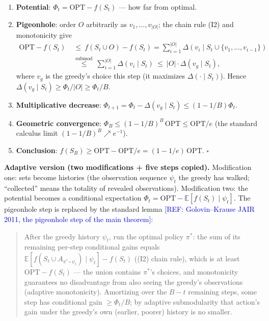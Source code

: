 \documentclass{article}
\newcommand{\refadd}[1]{\textcolor{blue}{[REF: #1]}}
\providecommand{\qed}{\hfill$\square$}
\begin{document}
\begin{enumerate}
\item \textbf{Potential}: $\Phi_t=\mathrm{OPT}-f(S_t)$ --- how far from optimal.
\item \textbf{Pigeonhole}: order $O$ arbitrarily as $v_1,\dots,v_{|O|}$; the chain rule (I2) and monotonicity give
\[
\begin{aligned}
\mathrm{OPT}-f(S_t)\;&\le\ f(S_t\cup O)-f(S_t)=\sum_{i=1}^{|O|}\Delta(v_i\mid S_t\cup\{v_1,\dots,v_{i-1}\})\\
&\overset{\text{submod}}{\le}\ \sum_{i=1}^{|O|}\Delta(v_i\mid S_t)\ \le\ |O|\cdot\Delta(v_g\mid S_t),
\end{aligned}
\]
where $v_g$ is the greedy's choice this step (it maximizes $\Delta(\cdot\mid S_t)$). Hence $\Delta(v_g\mid S_t)\ge\Phi_t/|O|\ge\Phi_t/B$.
\item \textbf{Multiplicative decrease}: $\Phi_{t+1}=\Phi_t-\Delta(v_g\mid S_t)\le(1-1/B)\Phi_t$.
\item \textbf{Geometric convergence}: $\Phi_B\le(1-1/B)^B\,\mathrm{OPT}\le\mathrm{OPT}/e$ (the standard calculus limit $(1-1/B)^B\nearrow e^{-1}$).
\item \textbf{Conclusion}: $f(S_B)\ge\mathrm{OPT}-\mathrm{OPT}/e=(1-1/e)\,\mathrm{OPT}$. \qed{}
\end{enumerate}

\textbf{Adaptive version (two modifications + five steps copied).} Modification one: sets become histories (the observation sequence $\psi_t$ the greedy has walked; ``collected'' means the totality of revealed observations). Modification two: the potential becomes a conditional expectation $\Phi_t=\mathrm{OPT}-\mathbb E[f(S_t)\mid\psi_t]$. The pigeonhole step is replaced by the standard lemma \refadd{Golovin--Krause JAIR 2011, the pigeonhole step of the main theorem}:

\begin{quote}
After the greedy history $\psi_t$, run the optimal policy $\pi^*$: the sum of its remaining per-step conditional gains equals $\mathbb E[f(S_t\cup A_{\pi^*\circ\psi_t})\mid\psi_t]-f(S_t)$ ((I2) chain rule), which is at least $\mathrm{OPT}-f(S_t)$ --- the union contains $\pi^*$'s choices, and monotonicity guarantees no disadvantage from also seeing the greedy's observations (adaptive monotonicity). Amortizing over the $B-t$ remaining steps, some step has conditional gain $\ge\Phi_t/B$; by adaptive submodularity that action's gain under the greedy's own (earlier, poorer) history is no smaller.
\end{quote}
\end{document}
